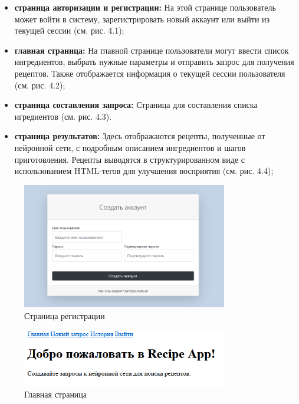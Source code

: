 {{    \begin{itemize}
        \item \textbf{страница авторизации и регистрации:} На этой странице пользователь может войти в систему, зарегистрировать новый аккаунт или выйти из текущей сессии (см. рис. 4.1);
        \item \textbf{главная страница:} На главной странице пользователи могут ввести список ингредиентов, выбрать нужные параметры и отправить запрос для получения рецептов. Также отображается информация о текущей сессии пользователя (см. рис. 4.2);
        \item \textbf{страница составления запроса:} Страница для составления списка игредиентов (см. рис. 4.3).
        \item \textbf{страница результатов:} Здесь отображаются рецепты, полученные от нейронной сети, с подробным описанием ингредиентов и шагов приготовления. Рецепты выводятся в структурированном виде с использованием HTML-тегов для улучшения восприятия (см. рис. 4.4);
    \end{itemize}
    \begin{figure}[H]
        \centering
        \includegraphics[width=0.8\textwidth]{assets/registration.png} 
        \caption{Страница регистрации}
    \end{figure}
    \begin{figure}[H]
        \centering
        \includegraphics[width=0.8\textwidth]{assets/index.png} 
        \caption{Главная страница}
    \end{figure}
    \begin{figure}[H]

\end{figure}}}

